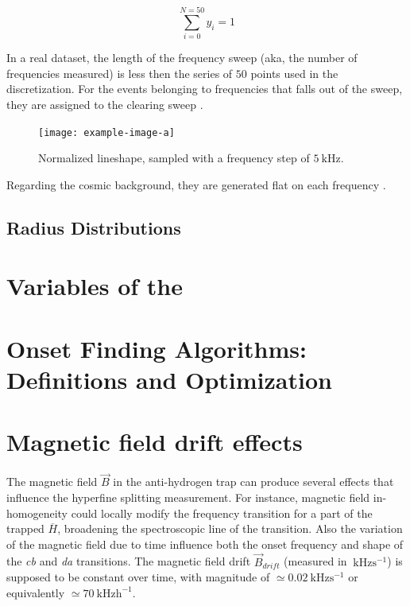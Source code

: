 \documentclass[11pt,a4paper,oneside]{article}
\begin{document}
\begin{equation}
\sum_{i = 0}^{N = 50} y_{i} = 1
\end{equation}

In a real dataset, the length of the frequency sweep (aka, the number of frequencies measured) is less then the series of $50$ points used in the discretization. For the events belonging to frequencies that falls out of the sweep, they are assigned to the clearing sweep {\color{red}{(not done yet)}}.

\begin{figure}
\centering
\texttt{[image: example-image-a]}
\caption{Normalized lineshape, sampled with a frequency step of $\SI{5}{\kilo \hertz}$.}
\end{figure}

Regarding the cosmic background, they are generated flat on each frequency {\color{red}{together with the background annihilations due to residual gas}}. 

\subsection{Radius Distributions}
 
 
\section{Variables of the }



\section{Onset Finding Algorithms: Definitions and Optimization}

\section{Magnetic field drift effects}

The magnetic field $\vec{B}$ in the anti-hydrogen trap can produce several effects that influence the hyperfine splitting measurement. For instance, magnetic field in-homogeneity could locally modify the frequency transition for a part of the trapped $\overline{H}$, broadening the spectroscopic line of the transition. Also
the variation of the magnetic field due to time influence both the onset frequency and shape of the \textit{cb} and \textit{da} transitions. The magnetic field drift $\vec{B}_{drift}$ (measured in $\SI{}{\kilo \hertz \second\tothe{-1}}$) is supposed to be constant over time, with magnitude of $ \simeq \SI{0.02}{\kilo \hertz \second\tothe{-1}}$ or equivalently $ \simeq \SI{70}{\kilo \hertz \hour\tothe{-1}}$.
\end{document}
